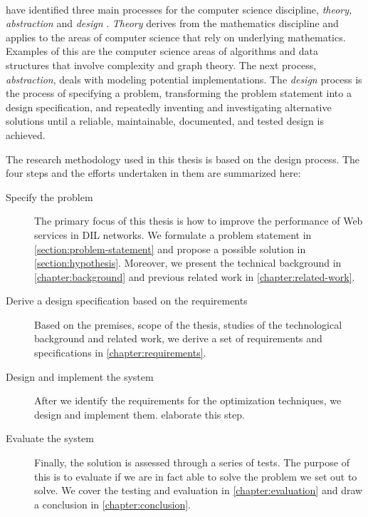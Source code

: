 \paragraph{}

 \citeauthor{denning} have identified three main processes for the computer
 science discipline, \textit{theory, abstraction} and \textit{design}
 \cite{denning}. \textit{Theory} derives from the mathematics discipline and
 applies to the areas of computer science that rely on underlying mathematics.
 Examples of this are the computer science areas of algorithms and data
 structures that involve complexity and graph theory. The next process,
 \textit{abstraction}, deals with modeling potential implementations. The
 \textit{design} process is the process of specifying a problem, transforming
 the problem statement into a design specification, and repeatedly inventing and
 investigating alternative solutions until a reliable, maintainable, documented,
 and tested design is achieved.

The research methodology used in this thesis is based on the design process. The
four steps and the efforts undertaken in them are summarized here:

\begin{description}

    \item[Specify the problem] The primary focus of this thesis is how to improve
    the performance of Web services in DIL networks. We formulate a problem
    statement in \cref{section:problem-statement} and propose a possible
    solution in \cref{section:hypothesis}. Moreover, we present the technical
    background in \cref{chapter:background} and previous related work in
    \cref{chapter:related-work}.

    \item[Derive a design specification based on the requirements] Based on the
    premises, scope of the thesis, studies of the technological background and
    related work, we derive a set of requirements and specifications in
    \cref{chapter:requirements}.

    \item[Design and implement the system] After we identify the requirements
    for the optimization techniques, we design and implement them.
     elaborate this step.

    \item[Evaluate the system] Finally, the solution is assessed through a
    series of tests. The purpose of this is to evaluate if we are in fact able
    to solve the problem we set out to solve. We cover the testing and
    evaluation in \cref{chapter:evaluation} and draw a conclusion in
    \cref{chapter:conclusion}.

\end{description}


